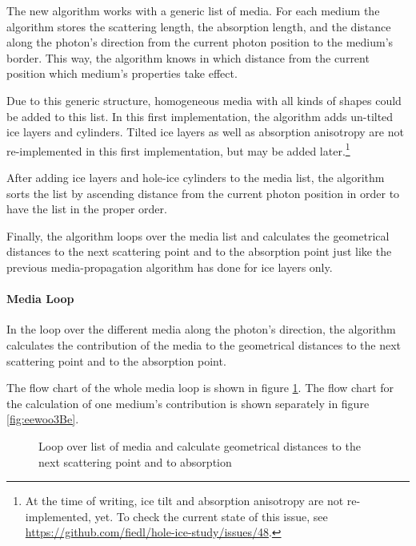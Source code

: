 
The new algorithm works with a generic list of media. For each medium the algorithm stores the scattering length, the absorption length, and the distance along the photon's direction from the current photon position to the medium's border. This way, the algorithm knows in which distance from the current position which medium's properties take effect.

Due to this generic structure, homogeneous media with all kinds of shapes could be added to this list. In this first implementation, the algorithm adds un-tilted ice layers and cylinders. Tilted ice layers as well as absorption anisotropy are not re-implemented in this first implementation, but may be added later.\footnote{At the time of writing, ice tilt and absorption anisotropy are not re-implemented, yet. To check the current state of this issue, see \url{https://github.com/fiedl/hole-ice-study/issues/48}.}

After adding ice layers and hole-ice cylinders to the media list, the algorithm sorts the list by ascending distance from the current photon position in order to have the list in the proper order.

Finally, the algorithm loops over the media list and calculates the geometrical distances to the next scattering point and to the absorption point just like the previous media-propagation algorithm has done for ice layers only.


\paragraph{Media Loop}
In the loop over the different media along the photon's direction, the algorithm calculates the contribution of the media to the geometrical distances to the next scattering point and to the absorption point.

The flow chart of the whole media loop is shown in figure \ref{fig:nimuriX4}. The flow chart for the calculation of one medium's contribution is shown separately in figure \ref{fig:eewoo3Be}.

\begin{figure}[htbp]
  \caption{Loop over list of media and calculate geometrical distances to the next scattering point and to absorption}
  \label{fig:nimuriX4}
\end{figure}

